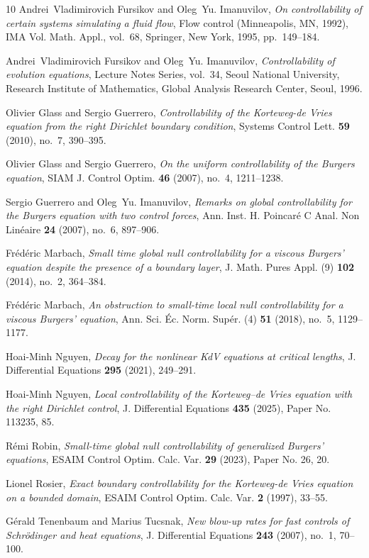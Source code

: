 \documentclass[11pt, reqno]{amsart}
\theoremstyle{plain}
\numberwithin{equation}{section}
\begin{document}
\begin{thebibliography}{10}
Andrei~Vladimirovich Fursikov and Oleg~Yu. Imanuvilov, \emph{On controllability of certain
  systems simulating a fluid flow}, Flow control ({M}inneapolis, {MN}, 1992),
  IMA Vol. Math. Appl., vol.~68, Springer, New York, 1995, pp.~149--184.

Andrei~Vladimirovich Fursikov and Oleg~Yu. Imanuvilov, \emph{Controllability of
  evolution equations}, Lecture Notes Series, vol.~34, Seoul National
  University, Research Institute of Mathematics, Global Analysis Research
  Center, Seoul, 1996. 

Olivier Glass and Sergio Guerrero, \emph{Controllability of the {K}orteweg-de
  {V}ries equation from the right {D}irichlet boundary condition}, Systems
  Control Lett. \textbf{59} (2010), no.~7, 390--395. 

Olivier Glass and Sergio Guerrero, \emph{On the uniform controllability of the
  {B}urgers equation}, SIAM J. Control Optim. \textbf{46} (2007), no.~4,
  1211--1238. 

Sergio Guerrero and Oleg~Yu. Imanuvilov, \emph{Remarks on global
  controllability for the {B}urgers equation with two control forces}, Ann.
  Inst. H. Poincar\'e{} C Anal. Non Lin\'eaire \textbf{24} (2007), no.~6,
  897--906. 

Fr\'ed\'eric Marbach, \emph{Small time global null controllability for a
  viscous {B}urgers' equation despite the presence of a boundary layer}, J.
  Math. Pures Appl. (9) \textbf{102} (2014), no.~2, 364--384. 

Fr\'{e}d\'{e}ric Marbach, \emph{An obstruction to small-time local null
  controllability for a viscous {B}urgers' equation}, Ann. Sci. \'{E}c. Norm.
  Sup\'{e}r. (4) \textbf{51} (2018), no.~5, 1129--1177. 

Hoai-Minh Nguyen, \emph{Decay for the nonlinear {K}d{V} equations at critical
  lengths}, J. Differential Equations \textbf{295} (2021), 249--291.

Hoai-Minh Nguyen, \emph{Local controllability of the {K}orteweg--de {V}ries equation
  with the right {D}irichlet control}, J. Differential Equations \textbf{435}
  (2025), Paper No. 113235, 85. 

R\'emi Robin, \emph{Small-time global null controllability of generalized
  {B}urgers' equations}, ESAIM Control Optim. Calc. Var. \textbf{29} (2023),
  Paper No. 26, 20. 

Lionel Rosier, \emph{Exact boundary controllability for the {K}orteweg-de
  {V}ries equation on a bounded domain}, ESAIM Control Optim. Calc. Var.
  \textbf{2} (1997), 33--55. 

Gérald Tenenbaum and Marius Tucsnak, \emph{New blow-up rates for fast controls
  of {S}chr\"odinger and heat equations}, J. Differential Equations
  \textbf{243} (2007), no.~1, 70--100. 

\end{thebibliography}
\end{document}
